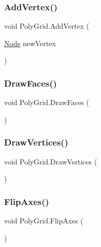 \subsubsection{\texorpdfstring{Add\+Vertex()}{AddVertex()}}
{\footnotesize\ttfamily void Poly\+Grid.\+Add\+Vertex (\begin{DoxyParamCaption}\item[{\mbox{\hyperlink{class_node}{Node}}}]{new\+Vertex }\end{DoxyParamCaption})}

\mbox{\label{class_poly_grid_a322dbff12283b94455ad415f554675c6}} 
\subsubsection{\texorpdfstring{Draw\+Faces()}{DrawFaces()}}
{\footnotesize\ttfamily void Poly\+Grid.\+Draw\+Faces (\begin{DoxyParamCaption}{ }\end{DoxyParamCaption})}

\mbox{\label{class_poly_grid_ae3c6db975b79d96ebb9ec0c16cfda518}} 
\subsubsection{\texorpdfstring{Draw\+Vertices()}{DrawVertices()}}
{\footnotesize\ttfamily void Poly\+Grid.\+Draw\+Vertices (\begin{DoxyParamCaption}{ }\end{DoxyParamCaption})}

\mbox{\label{class_poly_grid_a9a19971fbde8f1aaa806d54771857d8b}} 
\subsubsection{\texorpdfstring{Flip\+Axes()}{FlipAxes()}}
{\footnotesize\ttfamily void Poly\+Grid.\+Flip\+Axes (\begin{DoxyParamCaption}{ }\end{DoxyParamCaption})}

